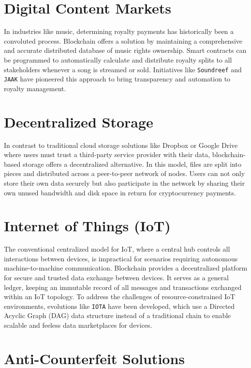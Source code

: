 \documentclass{scrbook}
\begin{document}
\section{Digital Content Markets}

In industries like music, determining royalty payments has historically been a convoluted process. Blockchain offers a solution by maintaining a comprehensive and accurate distributed database of music rights ownership. Smart contracts can be programmed to automatically calculate and distribute royalty splits to all stakeholders whenever a song is streamed or sold. Initiatives like \texttt{Soundreef} and \texttt{JAAK} have pioneered this approach to bring transparency and automation to royalty management.
    
\section{Decentralized Storage}

In contrast to traditional cloud storage solutions like Dropbox or Google Drive where users must trust a third-party service provider with their data, blockchain-based storage offers a decentralized alternative. In this model, files are split into pieces and distributed across a peer-to-peer network of nodes. Users can not only store their own data securely but also participate in the network by sharing their own unused bandwidth and disk space in return for cryptocurrency payments.
    
\section{Internet of Things (IoT)}

The conventional centralized model for IoT, where a central hub controls all interactions between devices, is impractical for scenarios requiring autonomous machine-to-machine communication. Blockchain provides a decentralized platform for secure and trusted data exchange between devices. It serves as a general ledger, keeping an immutable record of all messages and transactions exchanged within an IoT topology. To address the challenges of resource-constrained IoT environments, evolutions like \texttt{IOTA} have been developed, which use a Directed Acyclic Graph (DAG) data structure instead of a traditional chain to enable scalable and feeless data marketplaces for devices.
    
\section{Anti-Counterfeit Solutions}
\end{document}
